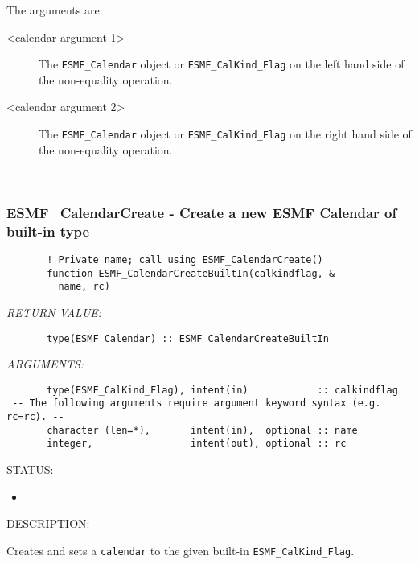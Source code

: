        The arguments are:
       \begin{description}   
       \item[<calendar argument 1>]
            The {\tt ESMF\_Calendar} object or {\tt ESMF\_CalKind\_Flag} on the
            left hand side of the non-equality operation.
       \item[<calendar argument 2>]
            The {\tt ESMF\_Calendar} object or {\tt ESMF\_CalKind\_Flag} on the
            right hand side of the non-equality operation.
       \end{description}
   
 
\mbox{}\hrulefill\ 
 
\subsubsection [ESMF\_CalendarCreate] {ESMF\_CalendarCreate - Create a new ESMF Calendar of built-in type}


 
\begin{verbatim}       ! Private name; call using ESMF_CalendarCreate()
       function ESMF_CalendarCreateBuiltIn(calkindflag, &
         name, rc)
 \end{verbatim}{\em RETURN VALUE:}
\begin{verbatim}       type(ESMF_Calendar) :: ESMF_CalendarCreateBuiltIn
 \end{verbatim}{\em ARGUMENTS:}
\begin{verbatim}       type(ESMF_CalKind_Flag), intent(in)            :: calkindflag
 -- The following arguments require argument keyword syntax (e.g. rc=rc). --
       character (len=*),       intent(in),  optional :: name
       integer,                 intent(out), optional :: rc
 \end{verbatim}
{\sf STATUS:}
   \begin{itemize}
   \item{}
   \end{itemize}
  
{\sf DESCRIPTION:\\ }


       Creates and sets a {\tt calendar} to the given built-in
       {\tt ESMF\_CalKind\_Flag}. 
  
